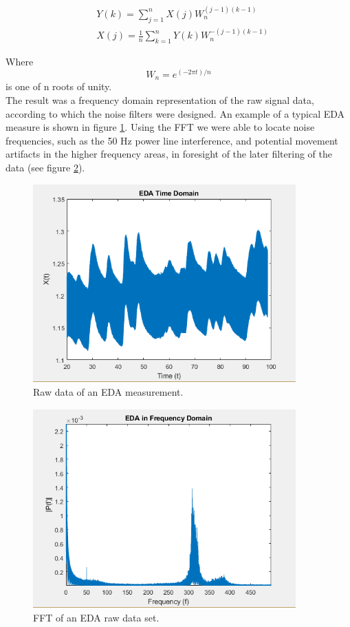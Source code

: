 \begin{align}\label{fft1}
& Y(k) = \sum\limits_{j=1}^n X(j) W_{n}^{(j-1)(k-1)} \\
& X(j) = \frac{1}{n} \sum\limits_{k=1}^n Y(k) W_{n}^{-(j-1)(k-1)} 
\end{align} 

Where
\begin{equation}
W_{n} = e^{(-2\pi t)/n}
\end{equation}
is one of n roots of unity.\\

The result was a frequency domain representation of the raw signal data, according to which the noise filters were designed. An example of a typical EDA measure is shown in figure \ref{rawEDAImg}. Using the FFT we were able to locate noise frequencies, such as the 50 Hz power line interference, and potential movement artifacts in the higher frequency areas, in foresight of the later filtering of the data (see figure \ref{fftEDAImg}).

\begin{figure}[ht]
\centering
\includegraphics[width=0.9\textwidth]{images/rawEDA.png}
\caption{Raw data of an EDA measurement.}
\label{rawEDAImg}
\end{figure}

\begin{figure}[ht]
\centering
\includegraphics[width=0.9\textwidth]{images/fftEDA.png}
\caption{FFT of an EDA raw data set.}
\label{fftEDAImg}
\end{figure}

